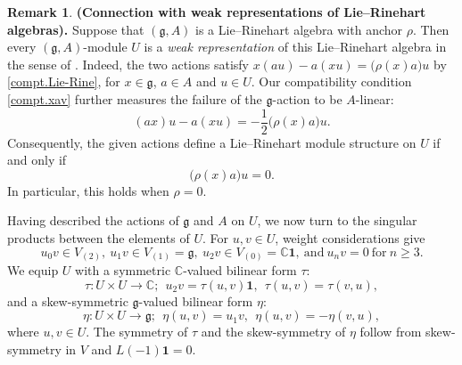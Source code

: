 \documentclass[12pt]{article}
\numberwithin{equation}{section}
\theoremstyle{definition}
\newtheorem{remark}[theorem]{Remark}
\theoremstyle{plain}
\newcommand{\bC}{\ensuremath{\mathbb{C}}}
\newcommand{\fg}{\mathfrak{g}}
\newcommand{\bone}{\mathbf{1 }}
\begin{document}
\begin{remark}\label{rmk:weak.rep}\textbf{(Connection with weak representations of Lie--Rinehart algebras).}
Suppose that $(\fg,A)$ is a Lie--Rinehart algebra with anchor $\rho$. Then every $(\fg,A)$-module $U$ is a \emph{weak representation} of this Lie--Rinehart algebra in the sense of \cite{PSTZ}. Indeed, the two actions satisfy $x(au)-a(xu)=\big(\rho(x)a\big)u$ by \eqref{compt.Lie-Rine}, for $x\in\fg$, $a\in A$ and $u\in U$. Our compatibility condition \eqref{compt.xav} further measures the failure of the $\fg$-action to be $A$-linear:
\begin{equation*}
    (ax)u-a(xu)=-\frac12\big(\rho(x)a\big)u.
\end{equation*}
Consequently, the given actions define a Lie--Rinehart module structure on $U$ if and only if 
\begin{equation*}
    \big(\rho(x)a\big)u=0.
\end{equation*}
In particular, this holds when $\rho=0$.
\end{remark}

Having described the actions of $\fg$ and $A$ on $U$, we now turn to the singular products between the elements of $U$. For $u,v\in U$, weight considerations give 
\begin{equation}\label{trun.uv}
    u_0v\in V_{(2)},\ u_1v\in V_{(1)}=\fg,\ u_2v\in V_{(0)}=\bC\bone,\ \text{and}\ u_nv=0\ \text{for}\ n\ge3.
\end{equation}
We equip $U$ with a symmetric $\bC$-valued bilinear form $\tau$:
\begin{equation}\label{tau}
    \tau: U\times U\rightarrow\bC;\ \ u_2v=\tau(u,v)\bone,\ \ \tau(u,v)=\tau(v,u),
\end{equation}
and a skew-symmetric $\fg$-valued bilinear form $\eta$:
\begin{equation}\label{eta}
    \eta: U\times U\rightarrow \fg;\ \ \eta(u,v)=u_1v,\ \ \eta(u,v)=-\eta(v,u),
\end{equation}
where $u,v\in U$. The symmetry of $\tau$ and the skew-symmetry of $\eta$
follow from skew-symmetry in $V$ and $L(-1)\bone=0$.
\end{document}
